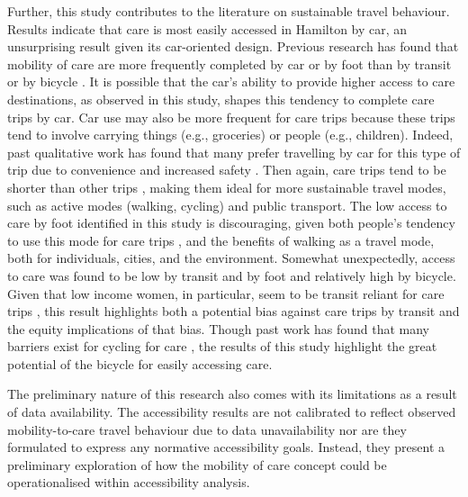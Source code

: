 \documentclass[
  authoryear,
  preprint,
  3p]{elsarticle}
\begin{document}
Further, this study contributes to the literature on sustainable travel
behaviour. Results indicate that care is most easily accessed in
Hamilton by car, an unsurprising result given its car-oriented design.
Previous research has found that mobility of care are more frequently
completed by car or by foot than by transit or by bicycle
\citep{ravensbergenExploratoryAnalysisMobility2022}. It is possible that
the car's ability to provide higher access to care destinations, as
observed in this study, shapes this tendency to complete care trips by
car. Car use may also be more frequent for care trips because these
trips tend to involve carrying things (e.g., groceries) or people (e.g.,
children). Indeed, past qualitative work has found that many prefer
travelling by car for this type of trip due to convenience and increased
safety
\citep{maciejewskaHaveChildrenThus2019, carverParentalChauffeursWhat2013}.
Then again, care trips tend to be shorter than other trips
\citep{ravensbergenExploratoryAnalysisMobility2022}, making them ideal
for more sustainable travel modes, such as active modes (walking,
cycling) and public transport. The low access to care by foot identified
in this study is discouraging, given both people's tendency to use this
mode for care trips \citep{ravensbergenExploratoryAnalysisMobility2022},
and the benefits of walking as a travel mode, both for individuals,
cities, and the environment. Somewhat unexpectedly, access to care was
found to be low by transit and by foot and relatively high by bicycle.
Given that low income women, in particular, seem to be transit reliant
for care trips \citep{ravensbergenExploratoryAnalysisMobility2022}, this
result highlights both a potential bias against care trips by transit
and the equity implications of that bias. Though past work has found
that many barriers exist for cycling for care
\citep{ravensbergenVelomobilitiesCareLowcycling2020, ravensbergenFeministGeographiesCycling2019, sersliRidingAloneTogether2020},
the results of this study highlight the great potential of the bicycle
for easily accessing care.

The preliminary nature of this research also comes with its limitations
as a result of data availability. The accessibility results are not
calibrated to reflect observed mobility-to-care travel behaviour due to
data unavailability nor are they formulated to express any normative
accessibility goals. Instead, they present a preliminary exploration of
how the mobility of care concept could be operationalised within
accessibility analysis.
\end{document}
